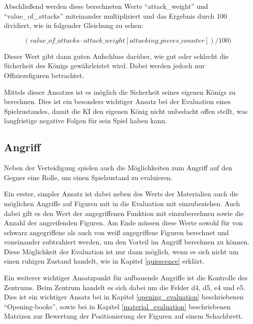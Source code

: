 Abschließend werden diese berechneten Werte ``attack\_weight'' und ``value\_of\_attacks'' miteinander multipliziert und das Ergebnis durch 100 dividiert, wie in folgender Gleichung zu sehen: \cite{O.V.2019b}

\begin{equation}
(value\_of\_attacks  \cdot  attack\_weight[attacking\_pieces\_counter]) / 100)
\end{equation}

Dieser Wert gibt dann guten Aufschluss darüber, wie gut oder schlecht die Sicherheit des Königs gewährleistet wird. Dabei werden jedoch nur Offiziersfiguren betrachtet.

Mittels dieser Ansatzes ist es möglich die Sicherheit seines eigenen Königs zu berechnen. Dies ist ein besonders wichtiger Ansatz bei der Evaluation eines Spielzustandes, damit die KI den eigenen König nicht unbedacht offen stellt, was langfristige negative Folgen für sein Spiel haben kann. 


\subsection{Angriff}\label{offense_evaluation}

Neben der Verteidigung spielen auch die Möglichkeiten zum Angriff auf den Gegner eine Rolle, um einen Spielzustand zu evaluieren.

Ein erster, simpler Ansatz ist dabei neben des Werts der Materialien auch die möglichen Angriffe auf Figuren mit in die Evaluation mit einzubeziehen. Auch dabei gilt es den Wert der angegriffenen Funktion mit einzuberechnen sowie die Anzahl der angreifenden Figuren. Am Ende müssen diese Werte sowohl für von schwarz angegriffene als auch von weiß angegriffene Figuren berechnet und voneinander subtrahiert werden, um den Vorteil im Angriff berechnen zu können. Diese Möglichkeit der Evaluation ist nur dann möglich, wenn es sich nicht um einen ruhigen Zustand handelt, wie in Kapitel \ref{quiescence} erklärt. 

Ein weiterer wichtiger Ansatzpunkt für aufbauende Angriffe ist die Kontrolle des Zentrums. Beim Zentrum handelt es sich dabei um die Felder d4, d5, e4 und e5. Dies ist ein wichtiger Ansatz bei in Kapitel \ref{opening_evaluation} beschriebenen ``Opening-books'', sowie bei in Kapitel \ref{material_evaluation} beschriebenen Matrizen zur Bewertung der Positionierung der Figuren auf einem Schachbrett. 

